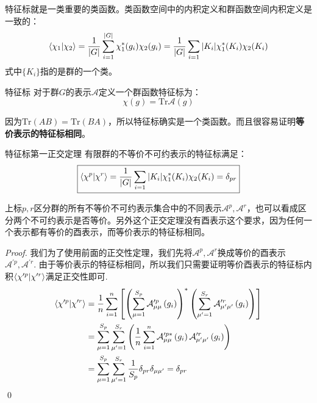 特征标就是一类重要的类函数。类函数空间中的内积定义和群函数空间内积定义是一致的：
\begin{equation}
	\braket{\chi_1|\chi_2}=\frac{1}{|G|}\sum_{i=1}^{|G|}\chi_1^*(g_i)\chi_2(g_i)=\frac{1}{|G|}\sum_{i=1}|K_i|\chi_1^*(K_i)\chi_2(K_i)
\end{equation}
式中$\{K_i\}$指的是群的一个类。
\begin{define}{特征标}
	对于群$G$的表示$\mathcal{A}$定义一个群函数特征标为：
	\begin{equation}
		\chi(g)=\mathrm{Tr}\mathscr{A}(g)
	\end{equation}
\end{define}
因为$\mathrm{Tr}(AB)=\mathrm{Tr}(BA)$，所以特征标确实是一个类函数。而且很容易证明\textbf{等价表示的特征标相同}。
\begin{theorem}{特征标第一正交定理}
	有限群的不等价不可约表示的特征标满足：
	\begin{equation}
		\boxed{
			\braket{\chi^p|\chi^r}=\frac{1}{|G|}\sum_{i=1}|K_i|\chi_1^*(K_i)\chi_2(K_i)=\delta_{pr}
		}
	\end{equation}

\setlength\parindent{2em}上标$p,r$区分群的所有不等价不可约表示集合中的不同表示$\mathscr{A}^p,\mathscr{A}^r$，也可以看成区分两个不可约表示是否等价。另外这个正交定理没有酉表示这个要求，因为任何一个表示都有等价的酉表示，而等价表示的特征标相同。
\end{theorem}
\begin{proof}
	我们为了使用前面的正交性定理，我们先将$\mathscr{A}^p,\mathscr{A}^r$换成等价的酉表示$\mathscr{A}^{\prime p},\mathscr{A}^{\prime r}$. 由于等价表示的特征标相同，所以我们只需要证明等价酉表示的特征标内积$\braket{\chi^{\prime p}|\chi^{\prime r}}$满足正交性即可.
	\begin{align*}
		\braket{\chi^{\prime p}|\chi^{\prime r}}& =\frac{1}{n} \sum_{i=1}^{n}\left[\left(\sum_{\mu=1}^{S_{p}} \mathcal{A}_{\mu \mu}^{\prime p}\left(g_{i}\right)\right)^{*}\left(\sum_{\mu^{\prime}=1}^{S_{r}} \mathcal{A}_{\mu^{\prime} \mu^{\prime}}^{\prime r}\left(g_{i}\right)\right)\right] \\
		& =\sum_{\mu=1}^{S_{p}} \sum_{\mu^{\prime}=1}^{S_{r}}\left(\frac{1}{n} \sum_{i=1}^{n}\mathcal{A}_{\mu \mu}^{\prime p *}\left(g_{i}\right) \mathcal{A}_{\mu^{\prime} \mu^{\prime}}^{\prime r}\left(g_{i}\right)\right) \\
		& =\sum_{\mu=1}^{S_{p}} \sum_{\mu^{\prime}=1}^{S_{r}} \frac{1}{S_{p}} \delta_{p r} \delta_{\mu \mu^{\prime}}=\delta_{p r}
	\end{align*}\qed
\end{proof}

